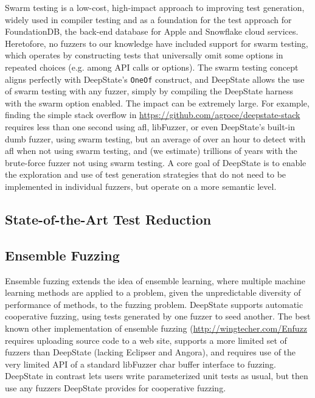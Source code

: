 \documentclass[sigconf]{acmart}
\begin{document}
Swarm testing \cite{ISSTA12} is a low-cost, high-impact approach to improving test generation, widely used in compiler testing \cite{} and as a foundation for the test approach for FoundationDB, the back-end database for Apple and Snowflake cloud services\cite{zhou2021foundationdb}.  Heretofore, no fuzzers to our knowledge have included support for swarm testing, which operates by constructing tests that universally omit some options in repeated choices (e.g. among API calls or options).  The swarm testing concept aligns perfectly with DeepState's {\tt OneOf} construct, and DeepState allows the use of swarm testing with any fuzzer, simply by compiling the DeepState harness with the swarm option enabled.  The impact can be extremely large.  For example, finding the simple stack overflow in \url{https://github.com/agroce/deepstate-stack} requires less than one second using afl, libFuzzer, or even DeepState's built-in dumb fuzzer, using swarm testing, but an average of over an hour to detect with afl when not using swarm testing, and (we estimate) trillions of years with the brute-force fuzzer not using swarm testing.  A core goal of DeepState is to enable the exploration and use of test generation strategies that do not need to be implemented in individual fuzzers, but operate on a more semantic level.

\subsection{State-of-the-Art Test Reduction}

\subsection{Ensemble Fuzzing}

Ensemble fuzzing \cite{chen2019enfuzz} extends the idea of ensemble learning, where multiple machine learning methods are applied to a problem, given the unpredictable diversity of performance of methods, to the fuzzing problem.  DeepState supports automatic cooperative fuzzing, using tests generated by one fuzzer to seed another.  The best known other implementation of ensemble fuzzing (\url{http://wingtecher.com/Enfuzz} requires uploading source code to a web site, supports a more limited set of fuzzers than DeepState (lacking Eclipser and Angora), and requires use of the very limited API of a standard libFuzzer char buffer interface to fuzzing.  DeepState in contrast lets users write parameterized unit tests as usual, but then use any fuzzers DeepState provides for cooperative fuzzing.
\end{document}

